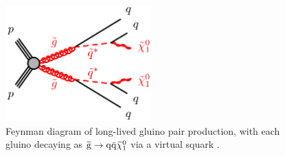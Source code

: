 \begin{figure}
\includegraphics[width=0.5\textwidth]{figs/theory/T1qqqqLL}
\caption{Feynman diagram of long-lived gluino pair production, with each gluino 
decaying as $\mathrm{\widetilde{g}} \rightarrow \mathrm{q}\bar{\mathrm{q}}\widetilde{\chi}_1^0$ via a 
virtual squark \vsquark.}
\label{fig:T1qqqqLL}
\end{figure}

